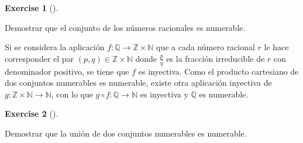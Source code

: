 \documentclass[
  letterpaper,
  DIV=11,
  numbers=noendperiod]{scrreport}
\theoremstyle{definition}
\newtheorem{exercise}{Exercise}[chapter]
\theoremstyle{remark}
\begin{document}
\leavevmode{}%
\begin{exercise}[]\label{exr-racionales-numerables}

Demostrar que el conjunto de los números racionales es numerable.

\end{exercise}

\begin{tcolorbox}[enhanced jigsaw, bottomtitle=1mm, opacityback=0, coltitle=black, toprule=.15mm, colback=white, titlerule=0mm, rightrule=.15mm, title=\textcolor{quarto-callout-tip-color}{\faLightbulb}\hspace{0.5em}{Solución}, breakable, bottomrule=.15mm, colbacktitle=quarto-callout-tip-color!10!white, toptitle=1mm, opacitybacktitle=0.6, left=2mm, leftrule=.75mm, colframe=quarto-callout-tip-color-frame, arc=.35mm]
Si se considera la aplicación
\(f:\mathbb{Q}\to \mathbb{Z}\times \mathbb{N}\) que a cada número
racional \(r\) le hace corresponder el par
\((p,q)\in \mathbb{Z}\times \mathbb{N}\) donde \(\frac{p}{q}\) es la
fracción irreducible de \(r\) con denominador positivo, se tiene que
\(f\) es inyectiva. Como el producto cartesiano de dos conjuntos
numerables es numerable, existe otra aplicación inyectiva de
\(g:\mathbb{Z}\times \mathbb{N}\to \mathbb{N}\), con lo que
\(g\circ f:\mathbb{Q}\to\mathbb{N}\) es inyectiva y \(\mathbb{Q}\) es
numerable.
\end{tcolorbox}

\leavevmode{}%
\begin{exercise}[]\label{exr-union-numerables}

Demostrar que la unión de dos conjuntos numerables es numerable.

\end{exercise}
\end{document}
